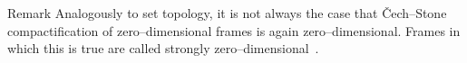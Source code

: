 \begin{block}{Remark}
    Analogously to set topology, it is not always the case that Čech--Stone compactification of zero--dimensional frames is again zero--dimensional. Frames in which this is true are called strongly zero--dimensional~\cite{kou2002strongly}.
\end{block}


